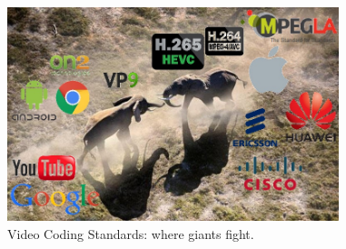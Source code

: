 \begin{figure}[htbp]
	\centering
	\includegraphics[width=0.86\textwidth]{fig/decisions/giants_fight.jpg} 
	\caption{Video Coding Standards: where giants fight.}\label{fig:giants-fight}
\end{figure}


